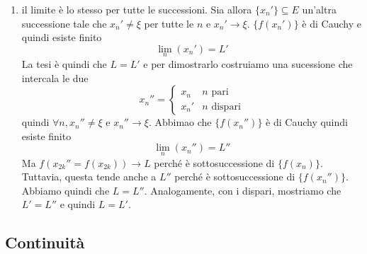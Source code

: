 \documentclass[a4paper]{article}
\begin{document}
\begin{radioactive}
\begin{snippetproof}{}
\begin{iffproof}
\begin{enumerate}
            tale che \(\forall x,x'\in (E\cap J) \backslash \{\xi\}, |f(x) - f(x')| < \varepsilon\).
            Per ipotesi, \(x_n \in E\) e \(x_n \neq \xi\) per tutte le \(n\)
            e \(x_n \to \xi\) quindi esiste \(N\) tale che \(\forall n \geq N, x_n \in (J \cap E) \backslash \{\xi\}\).
            Quindi \(\forall n,m \geq N\), \(x_n,x_m \in (J \cap E) \backslash \{\xi\}\)
            da cui \(|f(x_n) - f(x_m)| < \varepsilon\) come si voleva;
            \item il limite è lo stesso per tutte le successioni.
            Sia allora \(\{x_n'\} \subseteq E\) un'altra successione tale che
            \(x_n' \neq \xi\) per tutte le \(n\) e \(x_n' \to \xi\).
            \(\{f(x_n')\}\) è di Cauchy e quindi esiste finito
            \[
                \lim_n(x_n') = L'
            \]
            La tesi è quindi che \(L=L'\) e per dimostrarlo costruiamo
            una sucessione che intercala le due
            \[
                x_n'' = \begin{cases}
                    x_n & n \text{ pari} \\
                    x_n' & n \text{ dispari}
                \end{cases}
            \]
            quindi \(\forall n,x_n'' \neq \xi\) e \(x_n'' \to \xi\).
            Abbimao che \(\{f(x_n'')\}\) è di Cauchy quindi esiste finito
            \[
                \lim_n(x_n'') = L''
            \]
            Ma \(f(x_{2k}'' = f(x_{2k})) \to L\) perché è sottosuccessione di \(\{f(x_n)\}\).
            Tuttavia, questa tende anche a \(L''\) perché è sottosuccessione di \(\{f(x_n'')\}\).
            Abbiamo quindi che \(L=L''\).
            Analogamente, con i dispari, mostriamo che \(L'=L''\)
            e quindi \(L=L'\).
        \end{enumerate}
    \end{iffproof}
\end{snippetproof}
\end{radioactive}


\subsection{Continuità}
\end{document}
